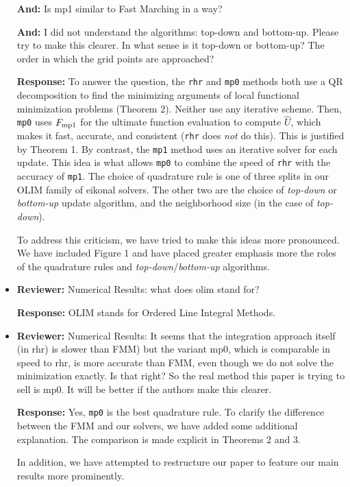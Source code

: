 \documentclass{article}
\begin{document}
\begin{itemize}
  \textbf{And:} Is mp1 similar to Fast Marching in a way?

  \textbf{And:} I did not understand the algorithms: top-down and
  bottom-up. Please try to make this clearer. In what sense is it
  top-down or bottom-up? The order in which the grid points are
  approached?

  \textbf{Response:} To answer the question, the \texttt{rhr} and
  \texttt{mp0} methods both use a QR decomposition to find the
  minimizing arguments of local functional minimization problems
  (Theorem 2). Neither use any iterative scheme. Then, \texttt{mp0}
  uses $F_{\operatorname{mp1}}$ for the ultimate function evaluation to compute
  $\hat{U}$, which makes it fast, accurate, and consistent
  (\texttt{rhr} does \emph{not} do this). This is justified by Theorem
  1. By contrast, the \texttt{mp1} method uses an iterative solver for
  each update. This idea is what allows \texttt{mp0} to combine the
  speed of \texttt{rhr} with the accuracy of \texttt{mp1}. The choice
  of quadrature rule is one of three splits in our OLIM family of
  eikonal solvers. The other two are the choice of \emph{top-down} or
  \emph{bottom-up} update algorithm, and the neighborhood size (in the
  case of \emph{top-down}).

  To address this criticism, we have tried to make this ideas more
  pronounced. We have included Figure 1 and have placed greater
  emphasis more the roles of the quadrature rules and
  \emph{top-down}/\emph{bottom-up} algorithms.

\item \textbf{Reviewer:} Numerical Results: what does olim stand for?

  \textbf{Response:} OLIM stands for Ordered Line Integral Methods.

\item \textbf{Reviewer:} Numerical Results: It seems that the
  integration approach itself (in rhr) is slower than FMM) but the
  variant mp0, which is comparable in speed to rhr, is more accurate
  than FMM, even though we do not solve the minimization exactly. Is
  that right? So the real method this paper is trying to sell is
  mp0. It will be better if the authors make this clearer.

  \textbf{Response:} Yes, \texttt{mp0} is the best quadrature rule. To
  clarify the difference between the FMM and our solvers, we have
  added some additional explanation. The comparison is made explicit
  in Theorems 2 and 3.

  In addition, we have attempted to restructure our paper to feature
  our main results more prominently.


\end{itemize}
\end{document}
